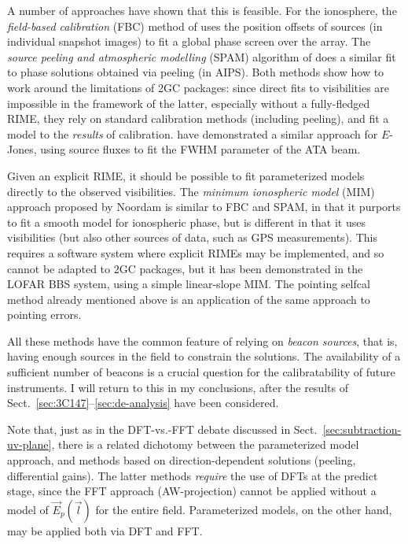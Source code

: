 \documentclass[]{aa}
\newcommand{\jones}[2]{\vec {#1}_{#2}}
\begin{document}
A number of approaches have shown that this is feasible. For the ionosphere, the \emph{field-based calibration} (FBC) method of \citet{Cotton:FBC} uses the position offsets of sources (in individual snapshot images) to fit a global phase screen over the array. The \emph{source peeling and atmospheric modelling} (SPAM) algorithm of \citet{Intema:SPAM} does a similar fit to phase solutions obtained via peeling (in AIPS). Both methods show how to work around the limitations of 2GC packages: since direct fits to visibilities are impossible in the framework of the latter, especially without a fully-fledged RIME, they rely on standard calibration methods (including peeling), and fit a model to the \emph{results} of calibration. \citet{Hull:ata-beam-fitting} have demonstrated a similar approach for $E$-Jones, using source fluxes to fit the FWHM parameter of the ATA beam. 

Given an explicit RIME, it should be possible to fit parameterized models directly to the observed visibilities. The \emph{minimum ionospheric model} (MIM) approach proposed by Noordam is similar to FBC and SPAM, in that it purports to fit a smooth model for ionospheric phase, but is different in that it uses visibilities (but also other sources of data, such as GPS measurements). This requires a software system where explicit RIMEs may be implemented, and so cannot be adapted to 2GC packages, but it has been demonstrated in the LOFAR BBS system, using a simple linear-slope MIM. The pointing selfcal method \citep{SB:pointing} already mentioned above is an application of the same approach to pointing errors.

All these methods have the common feature of relying on \emph{beacon sources}, that is, having enough sources in the field to constrain the solutions. The availability of a sufficient number of beacons is a crucial question for the calibratability of future instruments. I will return to this in my conclusions, after the results of Sect.~\ref{sec:3C147}--\ref{sec:de-analysis} have been considered.

Note that, just as in the DFT-vs.-FFT debate discussed in Sect.~\ref{sec:subtraction-uv-plane}, there is a related dichotomy between the parameterized model approach, and methods based on direction-dependent solutions (peeling, differential gains). The latter methods {\em require} the use of DFTs at the predict stage, since the FFT approach (AW-projection) cannot be applied without a model of $\jones{E}{p}(\vec l)$ for the entire field. Parameterized models, on the other hand, may be applied both via DFT and FFT. 
\end{document}

